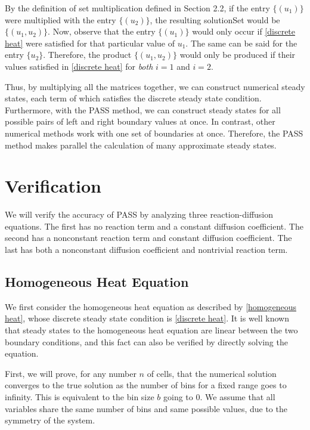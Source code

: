 \documentclass[11pt]{article}
\begin{document}
By the definition of set multiplication defined in Section 2.2, if the entry $\{(u_1)\}$ were multiplied with the entry $\{(u_2)\}$, the resulting solutionSet would be $\{(u_1, u_2)\}$. Now, observe that the entry $\{(u_1)\}$ would only occur if \cref{discrete heat} were satisfied for that particular value of $u_1$. The same can be said for the entry $\{u_2\}$. Therefore, the product $\{(u_1, u_2)\}$ would only be produced if their values satisfied in \cref{discrete heat} for \textit{both} $i = 1$ and $i = 2$.

Thus, by multiplying all the matrices together, we can construct numerical steady states, each term of which satisfies the discrete steady state condition. Furthermore, with the PASS method, we can construct steady states for all possible pairs of left and right boundary values at once. In contrast, other numerical methods work with one set of boundaries at once. Therefore, the PASS method makes parallel the calculation of many approximate steady states.

\section{Verification}\label{sec:verification}

We will verify the accuracy of PASS by analyzing three reaction-diffusion equations. The first has no reaction term and a constant diffusion coefficient. The second has a nonconstant reaction term and constant diffusion coefficient. The last has both a nonconstant diffusion coefficient and nontrivial reaction term.

\subsection{Homogeneous Heat Equation}

We first consider the homogeneous heat equation as described by \cref{homogeneous heat}, whose discrete steady state condition is \cref{discrete heat}. It is well known that steady states to the homogeneous heat equation are linear between the two boundary conditions, and this fact can also be verified by directly solving the equation.

First, we will prove, for any number $n$ of cells, that the numerical solution converges to the true solution as the number of bins for a fixed range goes to infinity. This is equivalent to the bin size $b$ going to 0. We assume that all variables share the same number of bins and same possible values, due to the symmetry of the system.
\end{document}
